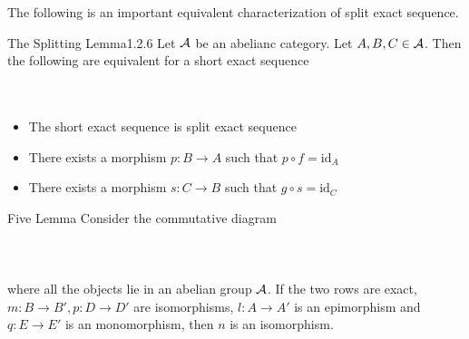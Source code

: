 \documentclass[a4paper]{article}
\begin{document}
The following is an important equivalent characterization of split exact sequence. 

\begin{thm}{The Splitting Lemma}{1.2.6} Let $\mathcal{A}$ be an abelianc category. Let $A,B,C\in\mathcal{A}$. Then the following are equivalent for a short exact sequence \\~\\
\\
\begin{itemize}
\item The short exact sequence is split exact sequence
\item There exists a morphism $p:B\to A$ such that $p\circ f=\text{id}_A$
\item There exists a morphism $s:C\to B$ such that $g\circ s=\text{id}_C$
\end{itemize} 
\end{thm}

\begin{lmm}{Five Lemma}{} Consider the commutative diagram \\~\\
\\~\\
where all the objects lie in an abelian group $\mathcal{A}$. If the two rows are exact, $m:B\to B',p:D\to D'$ are isomorphisms, $l:A\to A'$ is an epimorphism and $q:E\to E'$ is an monomorphism, then $n$ is an isomorphism. 
\end{lmm}
\end{document}
